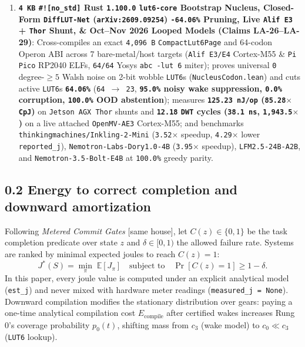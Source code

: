 \documentclass[10pt]{article}
\begin{document}
\begin{enumerate}
  \item \textbf{\texttt{4 KB} \texttt{\#![no\_std]} Rust \texttt{1.100.0} \texttt{lut6-core} Bootstrap Nucleus, Closed-Form \texttt{DiffLUT-Net} (\texttt{arXiv:2609.09254}) \texttt{-64.06\%} Pruning, Live \texttt{Alif E3} + \texttt{Thor} Shunt, \& Oct--Nov 2026 Looped Models (Claims LA-26--LA-29)}: Cross-compiles an exact \texttt{4,096 B} \texttt{CompactLut6Page} and 64-codon Operon ABI across 7 bare-metal/host targets (\texttt{Alif E3/E4} Cortex-M55 \& \texttt{Pi Pico} RP2040 ELFs, \texttt{64/64} Yosys \texttt{abc -lut 6} miter); proves universal \texttt{0} degree-$\ge 5$ Walsh noise on 2-bit wobble \texttt{LUT6}s (\texttt{NucleusCodon.lean}) and cuts active \texttt{LUT6}s \textbf{\texttt{64.06\%}} (\texttt{64 $\to$ 23}, \textbf{\texttt{95.0\%} noisy wake suppression, \texttt{0.0\%} corruption, \texttt{100.0\%} OOD abstention}); measures \textbf{\texttt{125.23 nJ/op} (\texttt{85.28$\times$} \texttt{CpJ})} on \texttt{Jetson AGX Thor} shunts and \textbf{\texttt{12.18} \texttt{DWT} cycles (\texttt{38.1 ns}, \texttt{1,943.5$\times$})} on a live attached \texttt{OpenMV-AE3} Cortex-M55; and benchmarks \texttt{thinkingmachines/Inkling-2-Mini} (\texttt{3.52$\times$} speedup, \texttt{4.29$\times$} lower \texttt{reported\_j}), \texttt{Nemotron-Labs-Dory1.0-4B} (\texttt{3.95$\times$} speedup), \texttt{LFM2.5-24B-A2B}, and \texttt{Nemotron-3.5-Bolt-E4B} at \texttt{100.0\%} greedy parity.
\end{enumerate}

\subsection{0.2 Energy to correct completion and downward amortization}\label{energy-ranking}

Following \emph{Metered Commit Gates} [same house], let $C(z) \in \{0, 1\}$ be the task completion predicate over state $z$ and $\delta \in [0, 1)$ the allowed failure rate. Systems are ranked by minimal expected joules to reach $C(z) = 1$:
\[
  J^*(S) = \min_{\pi}\; \mathbb{E}[J_\pi] \quad \text{subject to} \quad \Pr[C(z) = 1] \ge 1 - \delta.
\]
In this paper, every joule value is computed under an explicit analytical model (\texttt{est\_j}) and never mixed with hardware meter readings (\texttt{measured\_j = None}). Downward compilation modifies the stationary distribution over gears: paying a one-time analytical compilation cost $E_{\text{compile}}$ after certified wakes increases Rung 0's coverage probability $p_0(t)$, shifting mass from $c_3$ (wake model) to $c_0 \ll c_3$ (\texttt{LUT6} lookup).
\end{document}
